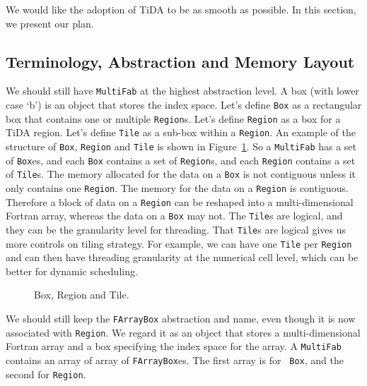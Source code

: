 We would like the adoption of TiDA to be as smooth as possible.  In
this section, we present our plan. 

\subsection{Terminology, Abstraction and Memory Layout}

We should still have {\tt MultiFab} at the highest abstraction level.
A box (with lower case `b') is an object that stores the index space.
Let's define {\tt Box} as a rectangular box that contains one or
multiple {\tt Region}s.  Let's define {\tt Region} as a box for a TiDA
region.  Let's define {\tt Tile} as a sub-box within a {\tt Region}.
An example of the structure of {\tt Box}, {\tt Region} and {\tt Tile}
is shown in Figure~\ref{fig:BRT}.  So a {\tt MultiFab} has a set of
{\tt Box}es, and each {\tt Box} contains a set of {\tt Region}s, and
each {\tt Region} contains a set of {\tt Tile}s.  The memory allocated
for the data on a {\tt Box} is not contiguous unless it only contains
one {\tt Region}.  The memory for the data on a {\tt Region} is
contiguous.  Therefore a block of data on a {\tt Region} can be
reshaped into a multi-dimensional Fortran array, whereas the data on a
{\tt Box} may not.  The {\tt Tile}s are logical, and they can be the
granularity level for threading.  That {\tt Tile}s are logical gives
us more controls on tiling strategy.  For example, we can have one
{\tt Tile} per {\tt Region} and can then have threading granularity at
the numerical cell level, which can be better for dynamic scheduling.

\begin{figure}
\centering
\caption{\label{fig:BRT} Box, Region and Tile.}
\end{figure}

We should still keep the {\tt FArrayBox} abstraction and name, even
though it is now associated with {\tt Region}.  We regard it as an
object that stores a multi-dimensional Fortran array and a box
specifying the index space for the array.  A {\tt MultiFab} contains
an array of array of {\tt FArrayBox}es.  The first array is for {\tt
  Box}, and the second for {\tt Region}.

